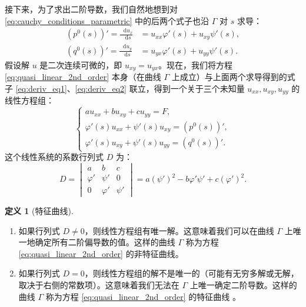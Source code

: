 \documentclass[a4paper, 12pt, oneside]{article} %
\newcommand{\diff}{\mathop{}\!\mathrm{d}}
\numberwithin{subsection}{section}
\numberwithin{subsubsection}{subsection}
\theoremstyle{plain}
\theoremstyle{definition}
\newtheorem{definition}[theorem]{定义}
\theoremstyle{remark}
\begin{document}
		接下来，为了求出二阶导数，我们自然地想到对 \eqref{eq:cauchy_conditions_parametric} 中的后两个式子也沿 \(\Gamma\) 对 \(s\) 求导：
		\begin{align}
			(p^0(s))' = \frac{\diff u_x}{\diff s} &= u_{xx}\varphi'(s) + u_{xy}\psi'(s), \label{eq:deriv_eq1} \\
			(q^0(s))' = \frac{\diff u_y}{\diff s} &= u_{yx}\varphi'(s) + u_{yy}\psi'(s). \label{eq:deriv_eq2}
		\end{align}
		假设解 \(u\) 是二次连续可微的，即 \(u_{xy} = u_{yx}\)。现在，我们将方程 \eqref{eq:quasi_linear_2nd_order} 本身（在曲线 \(\Gamma\) 上成立）与上面两个求导得到的式子 \eqref{eq:deriv_eq1}、\eqref{eq:deriv_eq2} 联立，得到一个关于三个未知量 \(u_{xx}, u_{xy}, u_{yy}\) 的线性方程组：
		\begin{equation}
			\begin{cases}
				a u_{xx} + b u_{xy} + c u_{yy} = F, \\
				\varphi'(s) u_{xx} + \psi'(s) u_{xy} = (p^0(s))', \\
				\varphi'(s) u_{xy} + \psi'(s) u_{yy} = (q^0(s))'.
			\end{cases}
		\end{equation}
		这个线性系统的系数行列式 \(D\) 为：
		\begin{equation}
			D = 
			\begin{vmatrix}
				a & b & c \\
				\varphi' & \psi' & 0 \\
				0 & \varphi' & \psi'
			\end{vmatrix}
			= a(\psi')^2 - b\varphi'\psi' + c(\varphi')^2.
		\end{equation}
		
		\begin{definition}[特征曲线]
			\begin{enumerate}[label=(\roman*)]
				\item 如果行列式 \(D \neq 0\)，则线性方程组有唯一解。这意味着我们可以在曲线 \(\Gamma\) 上唯一地确定所有二阶偏导数的值。这样的曲线 \(\Gamma\) 称为方程 \eqref{eq:quasi_linear_2nd_order} 的非特征曲线。
				\item 如果行列式 \(D = 0\)，则线性方程组的解不是唯一的（可能有无穷多解或无解，取决于右侧的常数项）。这意味着我们无法在 \(\Gamma\) 上唯一确定二阶导数。这样的曲线 \(\Gamma\) 称为方程 \eqref{eq:quasi_linear_2nd_order} 的特征曲线 。
			\end{enumerate}
		\end{definition}
		
\end{document}
